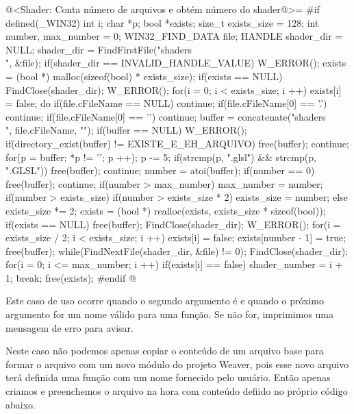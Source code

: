 {\iniciocodigo
@<Shader: Conta número de arquivos e obtém número do shader@>=
#if defined(_WIN32)
{
  int i;
  char *p;
  bool *exists;
  size_t exists_size = 128;
  int number, max_number = 0;
  WIN32_FIND_DATA file;
  HANDLE shader_dir = NULL;
  shader_dir = FindFirstFile("shaders\\", &file);
  if(shader_dir == INVALID_HANDLE_VALUE)
    W_ERROR();
  exists = (bool *) malloc(sizeof(bool) * exists_size);
  if(exists == NULL){
    FindClose(shader_dir);
    W_ERROR();
  }
  for(i = 0; i < exists_size; i ++)
    exists[i] = false;
  do{
    if(file.cFileName == NULL) continue;
    if(file.cFileName[0] == '.') continue;
    if(file.cFileName[0] == '\0') continue;
    buffer = concatenate("shaders\\", file.cFileName, "");
    if(buffer == NULL) W_ERROR();
    if(directory_exist(buffer) != EXISTE_E_EH_ARQUIVO){
      free(buffer);
      continue;
    }
    for(p = buffer; *p != '\0'; p ++);
    p -= 5;
    if(strcmp(p, ".glsl") && strcmp(p, ".GLSL")){
      free(buffer);
      continue;
    }
    number = atoi(buffer);
    if(number == 0){
      free(buffer);
      continue;
    }
    if(number > max_number)
      max_number = number;
    if(number > exists_size){
      if(number > exists_size * 2)
        exists_size = number;
      else
        exists_size *= 2;
      exists = (bool *) realloc(exists, exists_size * sizeof(bool));
      if(exists == NULL){
        free(buffer);
        FindClose(shader_dir);
        W_ERROR();
      }
      for(i = exists_size / 2; i < exists_size; i ++)
        exists[i] = false;
    }
    exists[number - 1] = true;
    free(buffer);
  }while(FindNextFile(shader_dir, &file) != 0);
  FindClose(shader_dir);
  for(i = 0; i <= max_number; i ++)
  if(exists[i] == false){
    shader_number = i + 1;
    break;
  }
  free(exists);
}
#endif
@
\fimcodigo


Este caso de uso ocorre quando o segundo argumento é
 e quando o próximo argumento for um nome válido
para uma função. Se não for, imprimimos uma mensagem de erro para
avisar.

Neste caso não podemos apenas copiar o conteúdo de um arquivo base
para formar o arquivo com um novo módulo do projeto Weaver, pois esse
novo arquivo terá definida uma função com um nome fornecido pelo
usuário. Então apenas criamos e preenchemos o arquivo na hora com
conteúdo defiido no próprio código abaixo.

}
